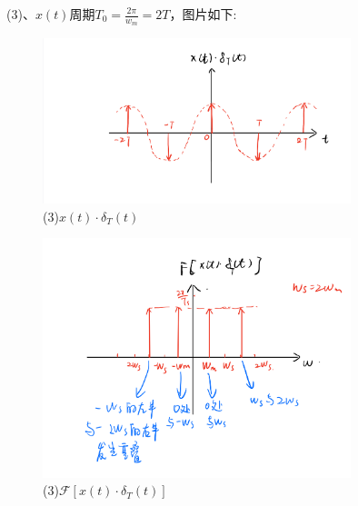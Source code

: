 \documentclass[answers]{exam}
\begin{document}
\begin{questions}
\newpage
(3)、$x(t)$周期$T_0=\frac{2\pi}{w_m}=2T$，图片如下:\\
\begin{figure}[h]
	\centering
	\includegraphics[width=0.8\textwidth,height=0.25\textheight]{pics/p2-3-1.PNG}
	\caption{(3)$x(t)\cdot\delta_T(t)$}
\end{figure}
\begin{figure}[h]
	\centering
	\includegraphics[width=0.8\textwidth,height=0.4\textheight]{pics/p2-3-2.PNG}
	\caption{(3)$\mathcal{F}[x(t)\cdot\delta_T(t)]$}
\end{figure}


\end{questions}
\end{document}
